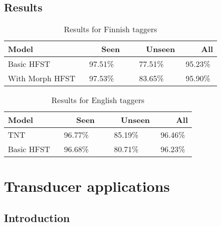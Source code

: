 \documentclass{llncs}
\begin{document}
\subsection{Results}

\begin{table}
\caption{Results for Finnish taggers}
\begin{center}
\begin{tabular}{lccc}
\hline 
Model            & ~~~~Seen & ~~~~Unseen & ~~~~All \\
\hline 
Basic HFST       &  97.51\% &    77.51\% & 95.23\% \\
With Morph HFST  &  97.53\% &    83.65\% & 95.90\% \\
\hline
\end{tabular}
\end{center}
\end{table}

\begin{table}
\caption{Results for English taggers}
\begin{center}
\begin{tabular}{lccc}
\hline
Model       & ~~~~Seen & ~~~~Unseen & ~~~~All \\
\hline
TNT         & 96.77\%  &    85.19\% & 96.46\% \\
Basic HFST  & 96.68\%  &    80.71\% & 96.23\% \\
\hline
\end{tabular}
\end{center}
\end{table}

\section{Transducer applications}

\subsection{Introduction}
\end{document}
